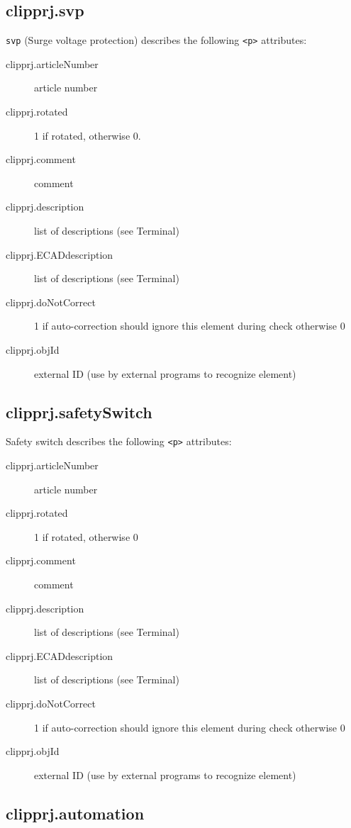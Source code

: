\documentclass[%
	a4paper,
	oneside,
	listof=numbered,
	parskip=half,
	headsepline=true,
	footsepline=false,
	normalheadings,
	0.7headlines,
	headexclude,
	]{scrbook}
\begin{document}
\subsection{clipprj.svp}
 
\verb|svp| (Surge voltage protection) describes the following \verb|<p>| attributes: 

\begin{description}
	\item[clipprj.articleNumber] article number 
	\item[clipprj.rotated] 1 if rotated, otherwise 0. 
	\item[clipprj.comment] comment 
	\item[clipprj.description] list of descriptions (see Terminal) 
	\item[clipprj.ECADdescription] list of descriptions (see Terminal) 
	\item[clipprj.doNotCorrect] 1 if auto-correction should ignore this element during check otherwise 0
	\item[clipprj.objId] external ID (use by external programs to recognize element)
\end{description}

\subsection{clipprj.safetySwitch}
 
Safety switch describes the following \verb|<p>| attributes: 

\begin{description}
	\item[clipprj.articleNumber] article number
	\item[ clipprj.rotated] 1 if rotated, otherwise 0
	\item[clipprj.comment] comment
	\item[clipprj.description] list of descriptions (see Terminal)
	\item[clipprj.ECADdescription] list of descriptions (see Terminal)
	\item[clipprj.doNotCorrect] 1 if auto-correction should ignore this element during check otherwise 0
	\item[clipprj.objId] external ID (use by external programs to recognize element)
\end{description}

\subsection{clipprj.automation}
 
\end{document}
